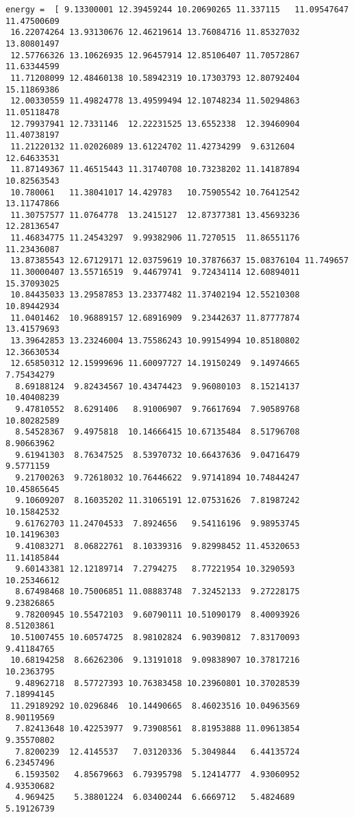 \documentclass[11pt]{article}
\begin{document}
\begin{Verbatim}[commandchars=\\\{\}]
energy =  [ 9.13300001 12.39459244 10.20690265 11.337115   11.09547647 11.47500609
 16.22074264 13.93130676 12.46219614 13.76084716 11.85327032 13.80801497
 12.57766326 13.10626935 12.96457914 12.85106407 11.70572867 11.63344599
 11.71208099 12.48460138 10.58942319 10.17303793 12.80792404 15.11869386
 12.00330559 11.49824778 13.49599494 12.10748234 11.50294863 11.05118478
 12.79937941 12.7331146  12.22231525 13.6552338  12.39460904 11.40738197
 11.21220132 11.02026089 13.61224702 11.42734299  9.6312604  12.64633531
 11.87149367 11.46515443 11.31740708 10.73238202 11.14187894 10.82563543
 10.780061   11.38041017 14.429783   10.75905542 10.76412542 13.11747866
 11.30757577 11.0764778  13.2415127  12.87377381 13.45693236 12.28136547
 11.46834775 11.24543297  9.99382906 11.7270515  11.86551176 11.23436087
 13.87385543 12.67129171 12.03759619 10.37876637 15.08376104 11.749657
 11.30000407 13.55716519  9.44679741  9.72434114 12.60894011 15.37093025
 10.84435033 13.29587853 13.23377482 11.37402194 12.55210308 10.89442934
 11.0401462  10.96889157 12.68916909  9.23442637 11.87777874 13.41579693
 13.39642853 13.23246004 13.75586243 10.99154994 10.85180802 12.36630534
 12.65850312 12.15999696 11.60097727 14.19150249  9.14974665  7.75434279
  8.69188124  9.82434567 10.43474423  9.96080103  8.15214137 10.40408239
  9.47810552  8.6291406   8.91006907  9.76617694  7.90589768 10.80282589
  8.54528367  9.4975818  10.14666415 10.67135484  8.51796708  8.90663962
  9.61941303  8.76347525  8.53970732 10.66437636  9.04716479  9.5771159
  9.21700263  9.72618032 10.76446622  9.97141894 10.74844247 10.45865645
  9.10609207  8.16035202 11.31065191 12.07531626  7.81987242 10.15842532
  9.61762703 11.24704533  7.8924656   9.54116196  9.98953745 10.14196303
  9.41083271  8.06822761  8.10339316  9.82998452 11.45320653 11.14185844
  9.60143381 12.12189714  7.2794275   8.77221954 10.3290593  10.25346612
  8.67498468 10.75006851 11.08883748  7.32452133  9.27228175  9.23826865
  9.78200945 10.55472103  9.60790111 10.51090179  8.40093926  8.51203861
 10.51007455 10.60574725  8.98102824  6.90390812  7.83170093  9.41184765
 10.68194258  8.66262306  9.13191018  9.09838907 10.37817216 10.2363795
  9.48962718  8.57727393 10.76383458 10.23960801 10.37028539  7.18994145
 11.29189292 10.0296846  10.14490665  8.46023516 10.04963569  8.90119569
  7.82413648 10.42253977  9.73908561  8.81953888 11.09613854  9.35570802
  7.8200239  12.4145537   7.03120336  5.3049844   6.44135724  6.23457496
  6.1593502   4.85679663  6.79395798  5.12414777  4.93060952  4.93530682
  4.969425    5.38801224  6.03400244  6.6669712   5.4824689   5.19126739

\end{Verbatim}
\end{document}

